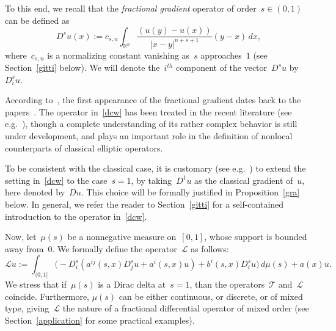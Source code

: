 \documentclass[11pt,hyp,]{nyjm}
\numberwithin{equation}{section}
\theoremstyle{remark}
\newcommand{\ml}{\mathcal{L}}
\newcommand{\Int}{\int_{\mathbb{R}^n}}
\begin{document}
To this end, we recall that the \textit{fractional gradient} operator of order~$ s\in (0,1)$ can be defined as 
\begin{equation}\label{dcw}
D^s u (x) := c_{s,n} \Int \frac{(u(y)-u(x))}{|x-y|^{n+s+1}} (y-x) \, dx,
\end{equation}
where~$c_{s,n}$ is a normalizing constant vanishing as~$s$ approaches~$1$ (see Section~\ref{gitti} below). We will  denote the~$i^{th}$ component of the vector~$D^su$
by~$D_i^s u$. 

According to~\cite[Section~1]{silhavi},
the first appearance of the fractional gradient dates back to the papers~\cite{MR107788, MR500133}.
The operator in~\eqref{dcw} has been treated in the recent literature (see e.g.~\cite{MR3420498, shieh, MR3615452, MR3714833, shiehtwo, comi, silhavi, piola, mora}), though a complete understanding of its rather complex behavior is still under development, and plays an important role in the definition of nonlocal
counterparts of classical elliptic operators. 

To be consistent with the classical case,
it is customary (see e.g.~\cite{silhavi}) to extend the setting
in~\eqref{dcw} to the case~$s=1$, by taking~$D^1u$
as the classical gradient of~$u$, here denoted by~$Du$. This choice will be formally justified in Proposition~\ref{gra}
below. In general, we refer the reader to Section~\ref{gitti} for a self-contained introduction to the operator in~\eqref{dcw}.

			
Now, let~$\mu(s)$ be a nonnegative measure on~$[0,1]$, whose support is bounded away from~$0$. We formally define the operator~$\mathcal{L}$ as follows:
			\begin{equation}\label{rawop}
	\ml u := \int_{(0,1]} \Big( - D^s_i \left(a^{ij}(s,x) D^s_j u + a^i(s,x) u \right) + b^i(s,x) D^s_i u \Big) \, d\mu(s) + a(x) u.
\end{equation}
We stress that if~$\mu(s)$ is a Dirac delta at~$s=1$, than the operators~$\mathcal{T}$ and~$\mathcal{L}$ coincide. Furthermore, $\mu(s)$ can be either continuous, or discrete, or of mixed type, giving~$\mathcal{L}$ the nature of a fractional differential operator of mixed order (see Section~\ref{application} for some practical examples).
\end{document}
